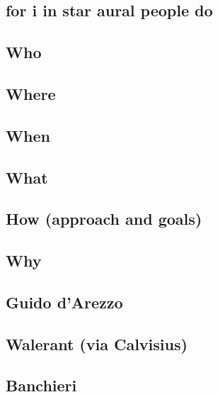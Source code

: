 \documentclass[]{book}
\theoremstyle{definition}
\theoremstyle{definition}
\theoremstyle{definition}
\theoremstyle{remark}
\begin{document}
\hypertarget{for-i-in-star-aural-people-do}{%
\subsection{for i in star aural people
do}\label{for-i-in-star-aural-people-do}}

\hypertarget{who}{%
\subsection{Who}\label{who}}

\hypertarget{where}{%
\subsection{Where}\label{where}}

\hypertarget{when}{%
\subsection{When}\label{when}}

\hypertarget{what}{%
\subsection{What}\label{what}}

\hypertarget{how-approach-and-goals}{%
\subsection{How (approach and goals)}\label{how-approach-and-goals}}

\hypertarget{why}{%
\subsection{Why}\label{why}}

\hypertarget{guido-darezzo}{%
\subsection{Guido d'Arezzo}\label{guido-darezzo}}

\hypertarget{walerant-via-calvisius}{%
\subsection{Walerant (via Calvisius)}\label{walerant-via-calvisius}}

\hypertarget{banchieri}{%
\subsection{Banchieri}\label{banchieri}}
\end{document}
